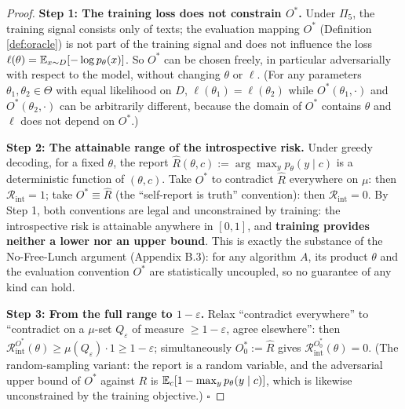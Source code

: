 \begin{proof}
\textbf{Step 1: The training loss does not constrain $O^{*}$.} Under $\Pi_5$, the training
signal consists only of texts; the evaluation mapping $O^{*}$ (Definition \ref{def:oracle})
is not part of the training signal and does not influence the loss
$\ell(\theta) = \mathbb{E}_{x \sim D}[-\log p_\theta(x)]$. So $O^{*}$ can be chosen freely, in
particular adversarially with respect to the model, without changing $\theta$ or
$\ell$. (For any parameters $\theta_1, \theta_2 \in \Theta$ with equal likelihood on $D$,
$\ell(\theta_1) = \ell(\theta_2)$ while $O^{*}(\theta_1, \cdot)$ and
$O^{*}(\theta_2, \cdot)$ can be arbitrarily different, because the domain of $O^{*}$
contains $\theta$ and $\ell$ does not depend on $O^{*}$.)

\textbf{Step 2: The attainable range of the introspective risk.} Under greedy decoding, for a
fixed $\theta$, the report $\widehat{R}(\theta,c) := \arg\max_y p_\theta(y\mid c)$ is a
deterministic function of $(\theta,c)$. Take $O^{*}$ to contradict $\widehat{R}$ everywhere on
$\mu$: then $\mathcal{R}_{\mathrm{int}} = 1$; take $O^{*} \equiv \widehat{R}$ (the
``self-report is truth'' convention): then $\mathcal{R}_{\mathrm{int}} = 0$. By Step 1, both
conventions are legal and unconstrained by training: the introspective risk is attainable
anywhere in $[0,1]$, and \textbf{training provides neither a lower nor an upper bound}. This
is exactly the substance of the No-Free-Lunch argument (Appendix B.3): for any algorithm $A$,
its product $\theta$ and the evaluation convention $O^{*}$ are statistically uncoupled, so no
guarantee of any kind can hold.

\textbf{Step 3: From the full range to $1-\varepsilon$.} Relax ``contradict everywhere'' to
``contradict on a $\mu$-set $Q_{\varepsilon}$ of measure $\ge 1-\varepsilon$, agree
elsewhere'': then
$\mathcal{R}_{\mathrm{int}}^{O^{*}}(\theta) \ge \mu(Q_{\varepsilon}) \cdot 1
\ge 1 - \varepsilon$; simultaneously $O^{*}_0 := \widehat{R}$ gives
$\mathcal{R}_{\mathrm{int}}^{O^{*}_0}(\theta) = 0$.
(The random-sampling variant: the report is a random variable, and the adversarial upper
bound of $O^{*}$ against $R$ is $\mathbb{E}_c[1 - \max_y p_\theta(y\mid c)]$, which is likewise
unconstrained by the training objective.) $\square$
\end{proof}


